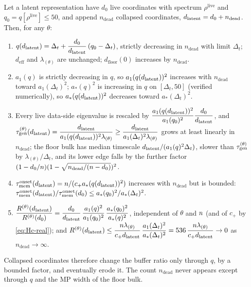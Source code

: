\begin{proposition}\label{prop:deadblock-real}
Let a latent representation have $d_0$ live coordinates with spectrum $\rho^{\mathrm{live}}$ and $q_0=q[\rho^{\mathrm{live}}]\le50$, and append $n_{\mathrm{dead}}$ collapsed coordinates, $d_{\mathrm{latent}}=d_0+n_{\mathrm{dead}}$. Then, for any $\theta$:
\begin{enumerate}
\item[(i)] $q(d_{\mathrm{latent}})=\Delta_t+\dfrac{d_0}{d_{\mathrm{latent}}}\,(q_0-\Delta_t)$, strictly decreasing in $n_{\mathrm{dead}}$ with limit $\Delta_t$; $d_{\mathrm{eff}}$ and $\lambda_{(\theta)}$ are unchanged; $d_{\mathrm{floor}}(0)$ increases by $n_{\mathrm{dead}}$.
\item[(ii)] $a_1(q)$ is strictly decreasing in $q$, so $a_1(q(d_{\mathrm{latent}}))^2$ increases with $n_{\mathrm{dead}}$ toward $a_1(\Delta_t)^2$; $a_\ast(q)^2$ is increasing in $q$ on $[\Delta_t,50]$ (verified numerically), so $a_\ast(q(d_{\mathrm{latent}}))^2$ decreases toward $a_\ast(\Delta_t)^2$.
\item[(iii)] Every live data-side eigenvalue is rescaled by $\dfrac{a_1(q(d_{\mathrm{latent}}))^2}{a_1(q_0)^2}\dfrac{d_0}{d_{\mathrm{latent}}}$, and $\tau_{\mathrm{gen}}^{(\theta)}(d_{\mathrm{latent}})=\dfrac{d_{\mathrm{latent}}}{a_1(q(d_{\mathrm{latent}}))^2\lambda_{(\theta)}}\ge\dfrac{d_{\mathrm{latent}}}{a_1(\Delta_t)^2\lambda_{(\theta)}}$ grows at least linearly in $n_{\mathrm{dead}}$; the floor bulk has median timescale $d_{\mathrm{latent}}/(a_1(q)^2\Delta_t)$, slower than $\tau_{\mathrm{gen}}^{(\theta)}$ by $\lambda_{(\theta)}/\Delta_t$, and its lower edge falls by the further factor $(1-d_0/n)(1-\sqrt{n_{\mathrm{dead}}/(n-d_0)})^2$.
\item[(iv)] $\tau_{\mathrm{mem}}^{\mathrm{onset}}(d_{\mathrm{latent}})=n/(c_+a_\ast(q(d_{\mathrm{latent}}))^2)$ increases with $n_{\mathrm{dead}}$ but is bounded: $\tau_{\mathrm{mem}}^{\mathrm{onset}}(d_{\mathrm{latent}})/\tau_{\mathrm{mem}}^{\mathrm{onset}}(d_0)\le a_\ast(q_0)^2/a_\ast(\Delta_t)^2$.
\item[(v)] $\dfrac{R^{(\theta)}(d_{\mathrm{latent}})}{R^{(\theta)}(d_0)}=\dfrac{d_0}{d_{\mathrm{latent}}}\,\dfrac{a_1(q)^2}{a_1(q_0)^2}\,\dfrac{a_\ast(q_0)^2}{a_\ast(q)^2}$, independent of $\theta$ and $n$ (and of $c_+$ by \eqref{eq:Hc-real}); and $R^{(\theta)}(d_{\mathrm{latent}})\le\dfrac{n\lambda_{(\theta)}}{c_+d_{\mathrm{latent}}}\,\dfrac{a_1(\Delta_t)^2}{a_\ast(\Delta_t)^2}=536\,\dfrac{n\lambda_{(\theta)}}{c_+d_{\mathrm{latent}}}\to0$ as $n_{\mathrm{dead}}\to\infty$.
\end{enumerate}
Collapsed coordinates therefore change the buffer ratio only through $q$, by a bounded factor, and eventually erode it. The count $n_{\mathrm{dead}}$ never appears except through $q$ and the MP width of the floor bulk.
\end{proposition}
